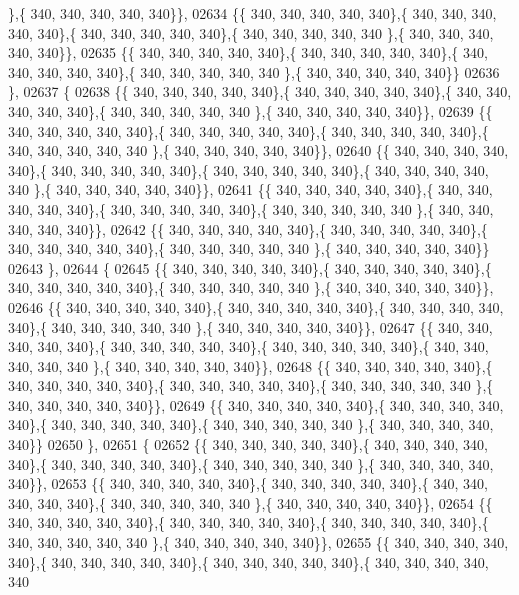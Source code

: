 \begin{DoxyCode}
      \},\{ 340, 340, 340, 340, 340\}\},
02634 \{\{ 340, 340, 340, 340, 340\},\{ 340, 340, 340, 340, 340\},\{ 340, 340, 340, 340, 340\},\{ 340, 340, 340, 340, 340
      \},\{ 340, 340, 340, 340, 340\}\},
02635 \{\{ 340, 340, 340, 340, 340\},\{ 340, 340, 340, 340, 340\},\{ 340, 340, 340, 340, 340\},\{ 340, 340, 340, 340, 340
      \},\{ 340, 340, 340, 340, 340\}\}
02636 \},
02637 \{
02638 \{\{ 340, 340, 340, 340, 340\},\{ 340, 340, 340, 340, 340\},\{ 340, 340, 340, 340, 340\},\{ 340, 340, 340, 340, 340
      \},\{ 340, 340, 340, 340, 340\}\},
02639 \{\{ 340, 340, 340, 340, 340\},\{ 340, 340, 340, 340, 340\},\{ 340, 340, 340, 340, 340\},\{ 340, 340, 340, 340, 340
      \},\{ 340, 340, 340, 340, 340\}\},
02640 \{\{ 340, 340, 340, 340, 340\},\{ 340, 340, 340, 340, 340\},\{ 340, 340, 340, 340, 340\},\{ 340, 340, 340, 340, 340
      \},\{ 340, 340, 340, 340, 340\}\},
02641 \{\{ 340, 340, 340, 340, 340\},\{ 340, 340, 340, 340, 340\},\{ 340, 340, 340, 340, 340\},\{ 340, 340, 340, 340, 340
      \},\{ 340, 340, 340, 340, 340\}\},
02642 \{\{ 340, 340, 340, 340, 340\},\{ 340, 340, 340, 340, 340\},\{ 340, 340, 340, 340, 340\},\{ 340, 340, 340, 340, 340
      \},\{ 340, 340, 340, 340, 340\}\}
02643 \},
02644 \{
02645 \{\{ 340, 340, 340, 340, 340\},\{ 340, 340, 340, 340, 340\},\{ 340, 340, 340, 340, 340\},\{ 340, 340, 340, 340, 340
      \},\{ 340, 340, 340, 340, 340\}\},
02646 \{\{ 340, 340, 340, 340, 340\},\{ 340, 340, 340, 340, 340\},\{ 340, 340, 340, 340, 340\},\{ 340, 340, 340, 340, 340
      \},\{ 340, 340, 340, 340, 340\}\},
02647 \{\{ 340, 340, 340, 340, 340\},\{ 340, 340, 340, 340, 340\},\{ 340, 340, 340, 340, 340\},\{ 340, 340, 340, 340, 340
      \},\{ 340, 340, 340, 340, 340\}\},
02648 \{\{ 340, 340, 340, 340, 340\},\{ 340, 340, 340, 340, 340\},\{ 340, 340, 340, 340, 340\},\{ 340, 340, 340, 340, 340
      \},\{ 340, 340, 340, 340, 340\}\},
02649 \{\{ 340, 340, 340, 340, 340\},\{ 340, 340, 340, 340, 340\},\{ 340, 340, 340, 340, 340\},\{ 340, 340, 340, 340, 340
      \},\{ 340, 340, 340, 340, 340\}\}
02650 \},
02651 \{
02652 \{\{ 340, 340, 340, 340, 340\},\{ 340, 340, 340, 340, 340\},\{ 340, 340, 340, 340, 340\},\{ 340, 340, 340, 340, 340
      \},\{ 340, 340, 340, 340, 340\}\},
02653 \{\{ 340, 340, 340, 340, 340\},\{ 340, 340, 340, 340, 340\},\{ 340, 340, 340, 340, 340\},\{ 340, 340, 340, 340, 340
      \},\{ 340, 340, 340, 340, 340\}\},
02654 \{\{ 340, 340, 340, 340, 340\},\{ 340, 340, 340, 340, 340\},\{ 340, 340, 340, 340, 340\},\{ 340, 340, 340, 340, 340
      \},\{ 340, 340, 340, 340, 340\}\},
02655 \{\{ 340, 340, 340, 340, 340\},\{ 340, 340, 340, 340, 340\},\{ 340, 340, 340, 340, 340\},\{ 340, 340, 340, 340, 340

\end{DoxyCode}
